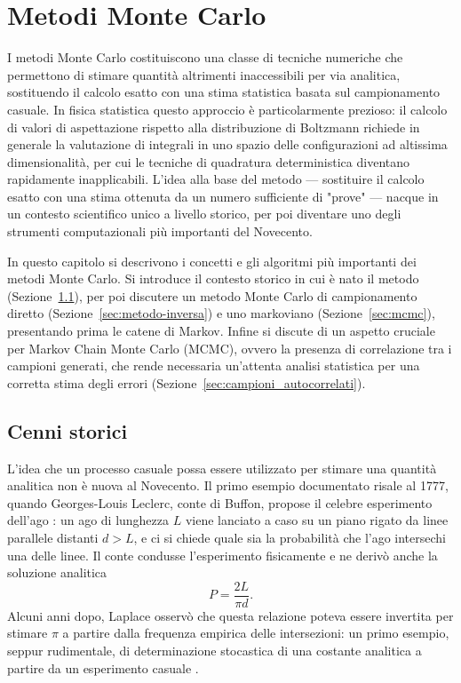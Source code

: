 \chapter{Metodi Monte Carlo}
\label{ch:mc}

I metodi Monte Carlo costituiscono una classe di tecniche numeriche che permettono di stimare quantità altrimenti inaccessibili per via analitica, sostituendo il calcolo esatto con una stima statistica basata sul campionamento casuale. In fisica statistica questo approccio è particolarmente prezioso: il calcolo di valori di aspettazione rispetto alla distribuzione di Boltzmann richiede in generale la valutazione di integrali in uno spazio delle configurazioni ad altissima dimensionalità, per cui le tecniche di quadratura deterministica diventano rapidamente inapplicabili. L'idea alla base del metodo — sostituire il calcolo esatto con una stima ottenuta da un numero sufficiente di "prove" — nacque in un contesto scientifico unico a livello storico, per poi diventare uno degli strumenti computazionali più importanti del Novecento.

In questo capitolo si descrivono i concetti e gli algoritmi più importanti dei metodi Monte Carlo. Si introduce il contesto storico in cui è nato il metodo (Sezione~\ref{sec:storia}), per poi discutere un metodo Monte Carlo di campionamento diretto (Sezione~\ref{sec:metodo-inversa}) e uno markoviano (Sezione~\ref{sec:mcmc}), presentando prima le catene di Markov. Infine si discute di un aspetto cruciale per Markov Chain Monte Carlo (MCMC), ovvero la presenza di correlazione tra i campioni generati, che rende necessaria un'attenta analisi statistica per una corretta stima degli errori (Sezione~\ref{sec:campioni_autocorrelati}).

\section{Cenni storici}
\label{sec:storia}
L'idea che un processo casuale possa essere utilizzato per stimare una quantità analitica non è nuova al Novecento. Il primo esempio documentato risale al 1777, quando Georges-Louis Leclerc, conte di Buffon, propose il celebre esperimento dell'ago \cite{buffon1777}: un ago di lunghezza $L$ viene lanciato a caso su un piano rigato da linee parallele distanti $d > L$, e ci si chiede quale sia la probabilità che l'ago intersechi una delle linee. Il conte condusse l'esperimento fisicamente e ne derivò anche la soluzione analitica
\begin{equation}
    P = \frac{2L}{\pi d}.
\end{equation}
Alcuni anni dopo, Laplace osservò che questa relazione poteva essere invertita per stimare $\pi$ a partire dalla frequenza empirica delle intersezioni: un primo esempio, seppur rudimentale, di determinazione stocastica di una costante analitica a partire da un esperimento casuale \cite{laplace1886}.

